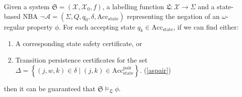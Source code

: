 \documentclass[acmlarge]{acmart}
\begin{document}
\begin{theorem}
  \label{omega-thm}
   Given a system $\mathfrak{S} = (\mathcal{X}, \mathcal{X}_0, f)$, a labelling function $\mathfrak{L}: \mathcal{X} \rightarrow \Sigma$ and a state-based NBA $\mathcal{\lnot A} = (\Sigma, Q, q_0, \delta, \text{Acc}_{\text{state}})$ representing the negation of an $\omega$-regular property $\phi$. For each accepting state $q_k \in \text{Acc}_{\text{state}}$, if we can find either:
  \begin{enumerate}
      \item A corresponding state safety certificate, or
      \item Transition persistence certificates for the set $\Delta = \left\{ (j, w, k) \in \delta \mid (j, k) \in \text{Acc}_{\text{state}}^{\text{pair}} \right\}$. (\ref{aspair})
  \end{enumerate}
  then it can be guaranteed that $\mathfrak{S} \models_{\mathfrak{L}} \phi$. 
\end{theorem}
\end{document}
